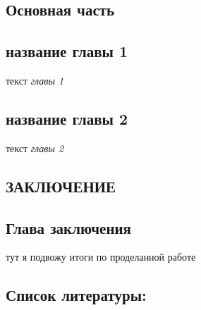 \documentclass{article}
\begin{document}
\newpage
\begin{center}
  \section*{\Large\textbf{Основная часть}}
\end{center}
\subsection*{ название главы 1}
текст \textit{главы 1}
\subsection*{ название главы 2}
текст \textit{главы 2}

\newpage
\begin{center}
    \section*{\Large\textbf{ЗАКЛЮЧЕНИЕ}}
\end{center}
\subsection*{Глава заключения}
тут я подвожу итоги по проделанной работе

\newpage

\begin{center}
    \subsection*{\textbf{Список литературы:}}
\end{center}
\end{document}
